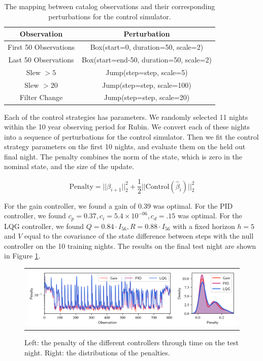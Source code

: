 \begin{table}
{
\begin{center}
\begin{tabular}{|c|c|}
\hline
Observation & Perturbation\\
\hline
First 50 Observations & Box(start=0, duration=50, scale=2)\\
Last 50 Observations & Box(start=end-50, duration=50, scale=2)\\
Slew $> 5$ & Jump(step=step, scale=5)\\
Slew $> 20$ & Jump(step=step, scale=100)\\
Filter Change & Jump(step=step, scale=20)\\
\hline
\end{tabular}
\end{center}
}
\caption[Observation To Perturbation Conversions]{The mapping between catalog observations and their corresponding perturbations for the control simulator.}
\label{tab:conversion}
\end{table}

Each of the control strategies has parameters. We randomly selected 11 nights within the 10 year observing period for Rubin. We convert each of these nights into a sequence of perturbations for the control simulator. Then we fit the control strategy parameters on the first 10 nights, and evaluate them on the held out final night. The penalty combines the norm of the state, which is zero in the nominal state, and the size of the update.

\begin{equation*}
\text{Penalty} = ||\beta_{i+1}||_2^2 + \frac{1}{2}||\text{Control}(\hat{\beta}_i)||_2^2
\end{equation*}

For the gain controller, we found a gain of 0.39 was optimal. For the PID controller, we found $c_p = 0.37, c_i= 5.4\times 10^{-06}, c_d=.15$ was optimal. For the LQG controller, we found $Q = 0.84 \cdot I_{56}, R=0.88\cdot I_{56}$ with a fixed horizon $h=5$ and $V$ equal to the covariance of the state difference between steps with the null controller on the 10 training nights. The results on the final test night are shown in Figure \ref{fig:control-results}.

\begin{figure}[!htbp]
\begin{center}
\begin{tabular}{c}
\includegraphics[width=\textwidth]{figs/control/control_results.png}
\end{tabular}
\end{center}
\caption[Controller Results]{Left: the penalty of the different controllers through time on the test night. Right: the distributions of the penalties. \label{fig:control-results}}
\end{figure}

